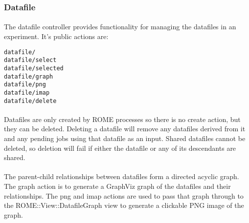 \subsubsection{Datafile}
\label{sec:controller_datafile}

\paragraph{}
The datafile controller provides functionality for managing the datafiles in an experiment. It's public actions are:

\begin{scriptsize}
\begin{verbatim}
datafile/
datafile/select
datafile/selected
datafile/graph
datafile/png
datafile/imap
datafile/delete
\end{verbatim}
\end{scriptsize}

\paragraph{}
Datafiles are only created by ROME processes so there is no create action, but they can be deleted. Deleting a datafile will remove any datafiles derived from it and any pending jobs using that datafile as an input. Shared datafiles cannot be deleted, so deletion will fail if either the datafile or any of its descendants are shared.

\paragraph{}
The parent-child relationships between datafiles form a directed acyclic graph. The graph action is to generate a GraphViz graph of the datafiles and their relationships. The png and imap actions are used to pass that graph through to the ROME::View::DatafileGraph view to generate a clickable PNG image of the graph.
